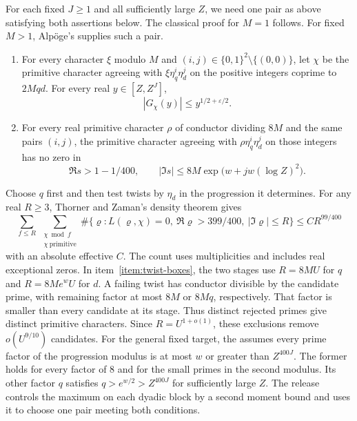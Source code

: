 %
For each fixed \(J\ge1\) and all sufficiently large \(Z\), we need one
pair as above satisfying both assertions below. The classical proof for
\(M=1\) follows. For fixed \(M>1\), Alp\"oge's
supplies such a pair.

\begin{enumerate}
\item\label{item:centred-twists} For every character \(\xi\) modulo \(M\) and
  \((i,j)\in\{0,1\}^2\setminus\{(0,0)\}\), let \(\chi\) be the
  primitive character agreeing with \(\xi\eta_q^i\eta_d^j\) on the
  positive integers coprime to \(2Mqd\). For every real \(y\in[Z,Z^J]\),
  \[
    |G_\chi(y)|\le y^{1/2+\varepsilon/2}.
  \]
\item\label{item:twist-boxes} For every real primitive character \(\rho\) of conductor
  dividing \(8M\) and the same pairs \((i,j)\), the primitive
  character agreeing with \(\rho\eta_q^i\eta_d^j\) on those integers
  has no zero in
  \[
    \Re s>1-1/400,\qquad
    |\Im s|\le8M\exp\bigl(w+jw(\log Z)^2\bigr).
  \]
\end{enumerate}

Choose \(q\) first and then test twists by \(\eta_d\) in the progression
it determines. For any real \(R\ge3\),
Thorner and Zaman's density theorem gives
\[
 \sum_{f\le R}\ \sum_{\substack{\chi\bmod f\\ \chi\ \mathrm{primitive}}}
 \#\{\varrho:L(\varrho,\chi)=0,\ \Re\varrho>399/400,\
                              |\Im\varrho|\le R\}
 \le C R^{99/400}
\]
with an absolute effective \(C\). The count uses multiplicities and
includes real exceptional zeros.
\cite[arXiv v4, (1.1)--(1.2) and Theorem~1.2]{f1thorner-zaman-density}
In item~\ref{item:twist-boxes}, the two stages use \(R=8MU\) for \(q\)
and \(R=8Me^wU\) for \(d\). A failing twist has conductor divisible by
the candidate prime, with remaining factor at most \(8M\) or \(8Mq\),
respectively. That factor is smaller than every candidate at its
stage. Thus distinct rejected primes give distinct primitive
characters. Since \(R=U^{1+o(1)}\), these exclusions remove
\(o(U^{9/10})\) candidates.
For the general fixed target, the
assumes every prime factor of the progression modulus is at most
\(w\) or greater than \(Z^{400J}\). The former holds for every factor of
\(8\) and for the small primes in the second modulus. Its other factor
\(q\) satisfies \(q>e^{w/2}>Z^{400J}\) for sufficiently large \(Z\).
The release controls the maximum on each dyadic block by a second
moment bound and uses it to choose one pair meeting both conditions.

